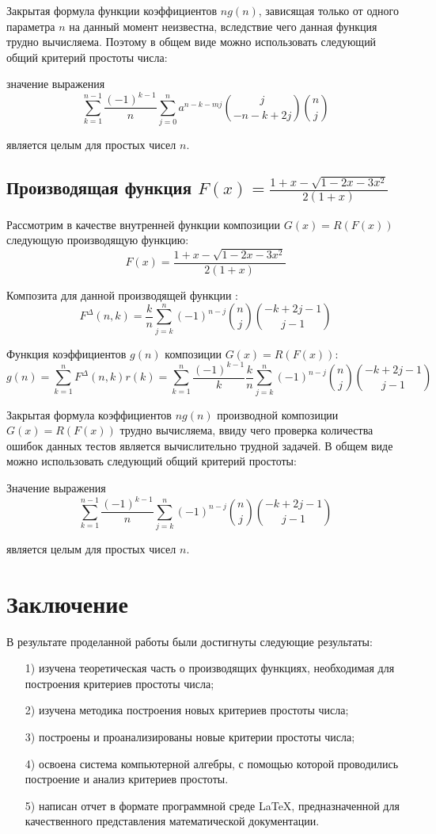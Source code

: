 \documentclass[
russian,
cp1251,
14pt,
simple
]{eskdtext}
\theoremstyle{definition}
\begin{document}
Закрытая формула функции коэффициентов $ng(n)$, зависящая только от одного параметра $n$ на данный момент неизвестна, вследствие чего данная функция трудно вычисляема. Поэтому в общем виде можно использовать следующий общий критерий простоты числа:

значение выражения
$$
\sum_{k=1}^{n-1}{\frac{(-1)^{k-1}}{n} \sum_{j=0}^{n}{a^{n-k-m j} {{j \choose -n-k+2j} {n \choose j}}}}
$$

является целым для простых чисел $n$.

\subsection{Производящая функция $F(x)=\frac{1+x-\sqrt{1-2x-3x^2}}{2(1+x)}$}
Рассмотрим в качестве внутренней функции композиции $G(x)=R(F(x))$ следующую производящую функцию:
$$
F(x)=\frac{1+x-\sqrt{1-2x-3x^2}}{2(1+x)}
$$

Композита для данной производящей функции \cite{KruchininVV}:
$$
F^\Delta(n,k)=\frac{k}{n} \sum\limits _{j=k}^n(-1)^{n-j}{n \choose j}{-k+2j-1 \choose j-1}
$$

Функция коэффициентов $g(n)$ композиции $G(x)=R(F(x))$:
$$
g(n)=\sum\limits _{k=1}^{n}{F^\Delta(n,k)r(k)}=\sum\limits _{k=1}^{n}\frac{(-1)^{k-1}}{k} 
\frac{k}{n} \sum\limits _{j=k}^n(-1)^{n-j}{n \choose j}{-k+2j-1 \choose j-1}
$$

Закрытая формула коэффициентов $ng(n)$ производной композиции $G(x)=R(F(x))$ трудно вычисляема, ввиду чего проверка количества ошибок данных тестов является вычислительно трудной задачей. В общем виде можно использовать следующий общий критерий простоты:

Значение выражения
$$
\sum\limits _{k=1}^{n-1}\frac{(-1)^{k-1}}{n} \sum\limits _{j=k}^n(-1)^{n-j}{n \choose j}{-k+2j-1 \choose j-1}
$$

является целым для простых чисел $n$.

\newpage
\section{Заключение}
В результате проделанной работы были достигнуты следующие результаты:
\begin{enumerate}
\item[1)] изучена теоретическая часть о производящих функциях, необходимая для построения критериев простоты числа; 
\item[2)] изучена методика построения новых критериев простоты числа;
\item[3)] построены и проанализированы новые критерии простоты числа;
\item[4)] освоена система компьютерной алгебры, с помощью которой проводились построение и анализ критериев простоты.
\item[5)] написан отчет в формате программной среде LaTeX, предназначенной для качественного представления математической документации.
\end{enumerate}
\end{document}
